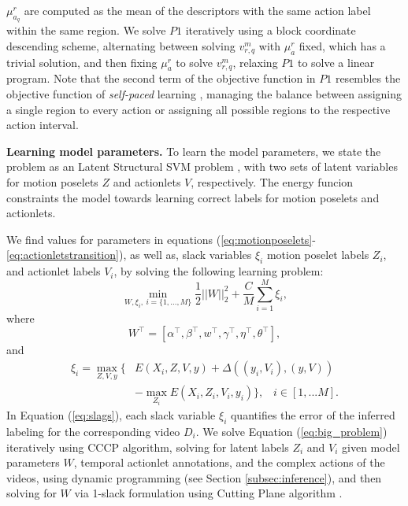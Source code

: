 $\mu_{a_q}^r$ are computed as the mean of the descriptors with the same action 
label within the same region. We solve $P1$ iteratively using a block coordinate 
descending scheme, alternating between solving $v_{r,q}^m$ with $\mu_{a}^r$ 
fixed, which has a trivial solution, and then fixing $\mu_{a}^r$ to solve 
$v_{r,q}^m$, relaxing $P1$ to solve a linear program. Note that the second term 
of the objective function in $P1$ resembles the objective function of 
\emph{self-paced} learning \cite{Kumar:EtAl:2010}, managing the balance between 
assigning a single region to every action or assigning all possible regions to 
the respective action interval.  

\textbf{Learning model parameters.}
To learn the model parameters, we state the problem as an Latent Structural SVM 
problem \cite{Yu:Joachims:2010}, with two sets of latent variables for motion 
poselets $Z$ and actionlets $V$, respectively. The energy funcion constraints 
the model towards learning correct labels for motion poselets and 
actionlets. 

We find values for parameters in equations 
(\ref{eq:motionposelets}-\ref{eq:actionletstransition}), as well as,
slack variables $\xi_i$ motion poselet labels $Z_i$, and actionlet labels $V_i$, 
by solving the following learning problem:
{\small
\begin{equation}
\label{eq:big_problem}
\min_{W,\xi_i,~i=\{1,\dots,M\}}    \frac{1}{2}||W||_2^2 + \frac{C}{M} \sum_{i=1}^M\xi_i ,
\end{equation}}
where
{\small \begin{equation}
W^\top=[\alpha^\top, \beta^\top, w^\top, \gamma^\top, \eta^\top, \theta^\top],
\end{equation}}
and
{\small
\begin{equation} \label{eq:slags}
\begin{split}
\xi_i = \max_{Z,V,y}  \{  & E(X_i, Z, V, y) + \Delta( (y_i,V_i), (y, V)) \\
 & - \max_{Z_i}{ E(X_i, Z_i, V_i, y_i)} \}, \; \;\; i\in[1,...M].	
\end{split}
\end{equation}}
In Equation (\ref{eq:slags}), each slack variable
$\xi_i$ quantifies the error of the inferred labeling for the corresponding 
video $D_i$. We solve Equation (\ref{eq:big_problem}) iteratively using CCCP 
algorithm, solving for latent labels $Z_i$ and $V_i$ given model parameters $W$, 
temporal actionlet annotations, and the complex actions of the videos, using 
dynamic programming (see Section \ref{subsec:inference}), and then solving for 
$W$ via 1-slack formulation using Cutting Plane algorithm 
\cite{Joachims2009}. 

